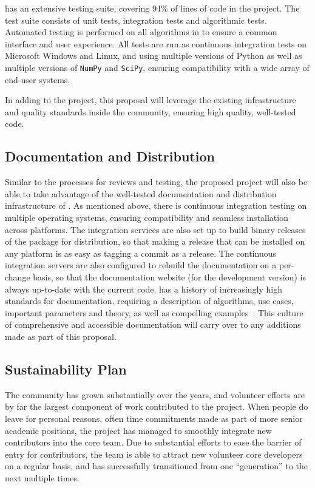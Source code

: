 \sklearn{} has an extensive testing suite, covering 94\% of lines of code in the project.
The test suite consists of unit tests, integration tests and algorithmic tests.
Automated testing is performed on all algorithms in \sklearn{} to ensure a common
interface and user experience.
All tests are run as continuous integration tests on Microsoft Windows and Linux, and using
multiple versions of Python as well as multiple versions of \texttt{NumPy} and \texttt{SciPy}, ensuring
compatibility with a wide array of end-user systems.

In adding to the \sklearn{} project, this proposal will leverage the existing infrastructure
and quality standards inside the \sklearn{} community, ensuring high quality, well-tested code.

\subsection{Documentation and Distribution}
Similar to the processes for reviews and testing, the proposed project will
also be able to take advantage of the well-tested documentation and distribution
infrastructure of \sklearn{}.
As mentioned above, there is continuous integration testing on multiple operating systems,
ensuring compatibility and seamless installation across platforms.
The integration services are also set up to build binary releases of the \sklearn{} package
for distribution, so that making a release that can be installed on any platform is as
easy as tagging a commit as a release.
The continuous integration servers are also configured to rebuild the documentation on a per-change
basis, so that the documentation website (for the development version) is always up-to-date
with the current code.
\sklearn{} has a history of increasingly high standards for documentation,
requiring a description of algorithms, use cases, important parameters and theory,
as well as compelling examples~\autocite{lovesklearn, benlorica}. This culture of comprehensive and accessible documentation
will carry over to any additions made as part of this proposal.

\subsection{Sustainability Plan}
The \sklearn{} community has grown substantially over the years, and volunteer efforts
are by far the largest component of work contributed to the project.
When people do leave for personal reasons, often time commitments made as part
of more senior academic positions, the project has managed to smoothly integrate new
contributors into the core team. Due to substantial efforts to ease the barrier
of entry for contributors, the \sklearn{} team is able to attract new volunteer
core developers on a regular basis, and has successfully transitioned from one
``generation'' to the next multiple times. 

